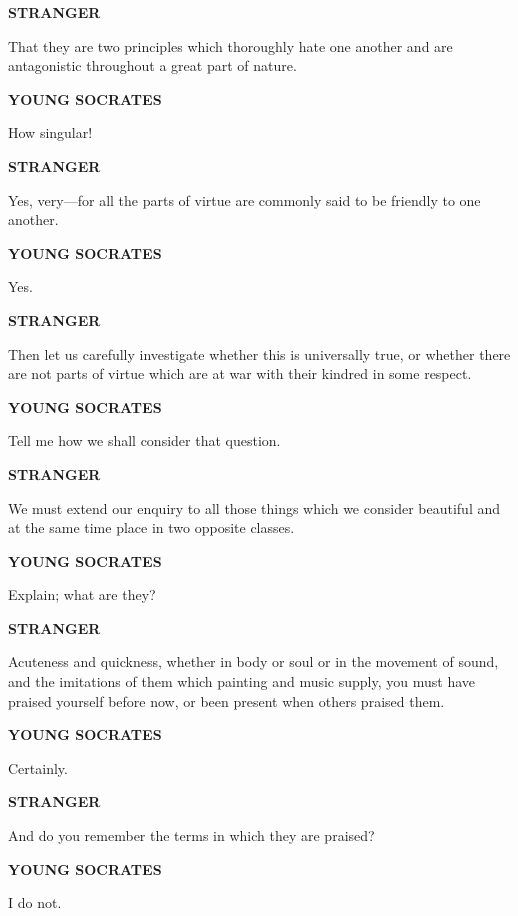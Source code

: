 \documentclass[11pt,letter]{article}
\begin{document}
\par \textbf{STRANGER}
\par   That they are two principles which thoroughly hate one another and are antagonistic throughout a great part of nature.

\par \textbf{YOUNG SOCRATES}
\par   How singular!

\par \textbf{STRANGER}
\par   Yes, very—for all the parts of virtue are commonly said to be friendly to one another.

\par \textbf{YOUNG SOCRATES}
\par   Yes.

\par \textbf{STRANGER}
\par   Then let us carefully investigate whether this is universally true, or whether there are not parts of virtue which are at war with their kindred in some respect.

\par \textbf{YOUNG SOCRATES}
\par   Tell me how we shall consider that question.

\par \textbf{STRANGER}
\par   We must extend our enquiry to all those things which we consider beautiful and at the same time place in two opposite classes.

\par \textbf{YOUNG SOCRATES}
\par   Explain; what are they?

\par \textbf{STRANGER}
\par   Acuteness and quickness, whether in body or soul or in the movement of sound, and the imitations of them which painting and music supply, you must have praised yourself before now, or been present when others praised them.

\par \textbf{YOUNG SOCRATES}
\par   Certainly.

\par \textbf{STRANGER}
\par   And do you remember the terms in which they are praised?

\par \textbf{YOUNG SOCRATES}
\par   I do not.
\end{document}
